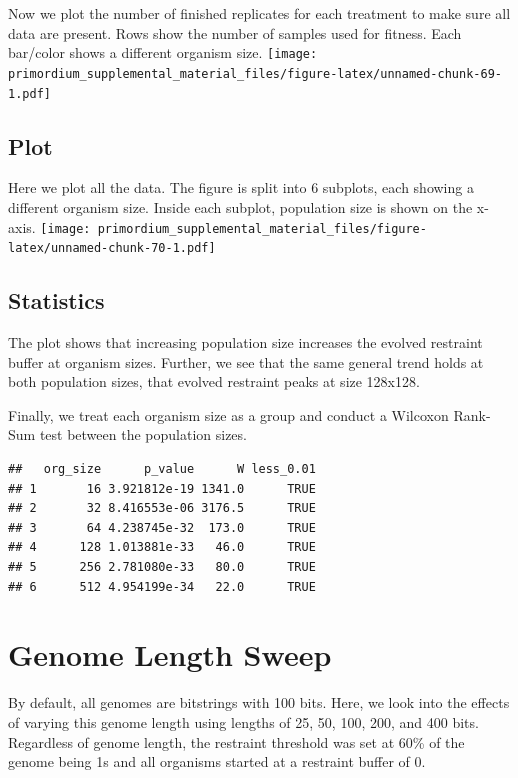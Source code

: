\documentclass[
]{book}
\begin{document}
Now we plot the number of finished replicates for each treatment to make sure all data are present.
Rows show the number of samples used for fitness.
Each bar/color shows a different organism size.
\texttt{[image: primordium\_supplemental\_material\_files/figure-latex/unnamed-chunk-69-1.pdf]}

\hypertarget{plot-1}{%
\section{Plot}\label{plot-1}}

Here we plot all the data.
The figure is split into 6 subplots, each showing a different organism size.
Inside each subplot, population size is shown on the x-axis.
\texttt{[image: primordium\_supplemental\_material\_files/figure-latex/unnamed-chunk-70-1.pdf]}

\hypertarget{statistics-4}{%
\section{Statistics}\label{statistics-4}}

The plot shows that increasing population size increases the evolved restraint buffer at organism sizes.
Further, we see that the same general trend holds at both population sizes, that evolved restraint peaks at size 128x128.

Finally, we treat each organism size as a group and conduct a Wilcoxon Rank-Sum test between the population sizes.

\begin{verbatim}
##   org_size      p_value      W less_0.01
## 1       16 3.921812e-19 1341.0      TRUE
## 2       32 8.416553e-06 3176.5      TRUE
## 3       64 4.238745e-32  173.0      TRUE
## 4      128 1.013881e-33   46.0      TRUE
## 5      256 2.781080e-33   80.0      TRUE
## 6      512 4.954199e-34   22.0      TRUE
\end{verbatim}

\hypertarget{genome-length-sweep}{%
\chapter{Genome Length Sweep}\label{genome-length-sweep}}

By default, all genomes are bitstrings with 100 bits.
Here, we look into the effects of varying this genome length using lengths of 25, 50, 100, 200, and 400 bits.
Regardless of genome length, the restraint threshold was set at 60\% of the genome being 1s and all organisms started at a restraint buffer of 0.
\end{document}

